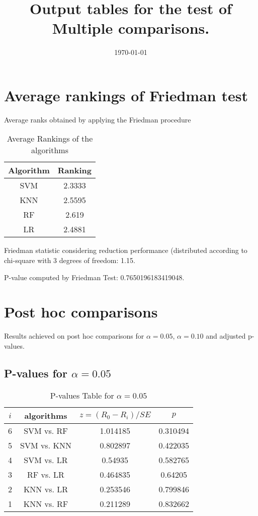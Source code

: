 \documentclass[a4paper,10pt]{article}
\title{Output tables for the test of Multiple comparisons.}
\author{}
\date{\today}
\begin{document}
\begin{landscape}
\pagestyle{empty}
\maketitle
\thispagestyle{empty}
\section{Average rankings of Friedman test}



Average ranks obtained by applying the Friedman procedure

\begin{table}[!htp]
\centering
\begin{tabular}{|c|c|}\hline
Algorithm&Ranking\\\hline
SVM & 2.3333\\
KNN & 2.5595\\
RF & 2.619\\
LR & 2.4881\\
\hline
\end{tabular}
\caption{Average Rankings of the algorithms}
\end{table}

Friedman statistic considering reduction performance (distributed according to chi-square with 3 degrees of freedom: 1.15.

P-value computed by Friedman Test: 0.7650196183419048.\newline



\pagebreak

\section{Post hoc comparisons}

Results achieved on post hoc comparisons for $\alpha = 0.05$, $\alpha = 0.10$ and adjusted p-values.

\subsection{P-values for $\alpha=0.05$}

\begin{table}[!htp]
\centering\scriptsize
\begin{tabular}{cccc}
$i$&algorithms&$z=(R_0 - R_i)/SE$&$p$\\
\hline6&SVM vs. RF&1.014185&0.310494\\
5&SVM vs. KNN&0.802897&0.422035\\
4&SVM vs. LR&0.54935&0.582765\\
3&RF vs. LR&0.464835&0.64205\\
2&KNN vs. LR&0.253546&0.799846\\
1&KNN vs. RF&0.211289&0.832662\\
\hline
\end{tabular}
\caption{P-values Table for $\alpha=0.05$}
\end{table}\pagebreak


\end{landscape}
\end{document}
